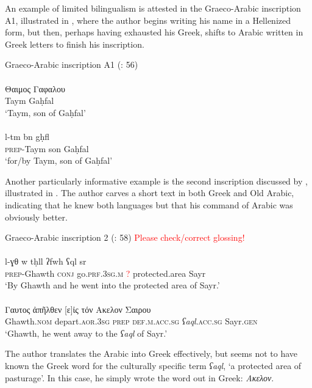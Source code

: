 \documentclass[output=paper]{langsci/langscibook}
\begin{document}
An example of limited bilingualism is attested in the Graeco-Arabic inscription A1, illustrated in , where the author begins writing his name in a Hellenized form, but then, perhaps having exhausted his Greek, shifts to Arabic written in Greek letters to finish his inscription.

\ea Graeco-Arabic inscription A1 (\citealt{Al-Jalladal-Manaser2016}: 56)\label{Taym}\\
 \\ 
\gll    Θαιμος Γαφαλου \\
        Taym Gaḥfal\\
\glt `Taym, son of Gaḥfal'\\

 \\
\gll   l-tm bn gḥfl \\
       \textsc{prep}-Taym son Gaḥfal \\
\glt `for/by Taym, son of Gaḥfal'\\
\z
\z

 Another particularly informative example is the second inscription discussed by \citet{Al-Jalladal-Manaser2016}, illustrated in . The author carves a short text in both Greek and Old Arabic, indicating that he knew both languages but that his command of Arabic was obviously better.

\ea Graeco-Arabic inscription 2 (\citealt{Al-Jalladal-Manaser2016}: 58) \textcolor{red}{Please check/correct glossing!}\label{Ghawth}\\
 \\
\gll   l-ɣθ w tḥll ʔfwh ʕql sr \\
       \textsc{prep}-Ghawth \textsc{conj} go.\textsc{prf.3sg.m} \textcolor{red}{?} protected.area Sayr\\
\glt `By Ghawth and he went into the protected area of Sayr.'\\
 \\ 
\gll    Γαυτος ἀπῆλθεν [ε]ἰς τόν Ακελον Σαιρου\\
Ghawth.\textsc{nom} depart.\textsc{aor.3sg} \textsc{prep} \textsc{def.m.acc.sg} \textit{ʕaql}.\textsc{acc.sg} Sayr.\textsc{gen}\\ 
\glt `Ghawth, he went away to the \textit{ʕaql} of Sayr.'\\
\z
\z

The author translates the Arabic into Greek effectively, but seems not to have known the Greek word for the culturally specific term \textit{ʕaql}, ‘a protected area of pasturage’. In this case, he simply wrote the word out in Greek: \textit{Ακελον}.
\end{document}
